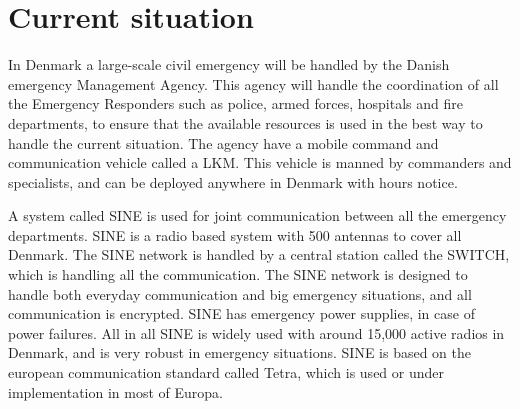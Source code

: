\section{Current situation}

In Denmark a large-scale civil emergency will be handled by the Danish emergency Management Agency. This agency will handle the coordination of all the Emergency Responders such as police, armed forces, hospitals and fire departments, to ensure that the available resources is used in the best way to handle the current situation. The agency have a mobile command and communication vehicle called a LKM. This vehicle is manned by commanders and specialists, and can be deployed anywhere in Denmark with hours notice.

A system called SINE is used for joint communication between all the emergency departments. SINE is a radio based system with 500 antennas to cover all Denmark. The SINE network is handled by a central station called the SWITCH, which is handling all the communication. The SINE network is designed to handle both everyday communication and big emergency situations, and all communication is encrypted. SINE has emergency power supplies, in case of power failures. All in all SINE is widely used with around 15,000 active radios in Denmark, and is very robust in emergency situations. SINE is based on the european communication standard called Tetra, which is used or under implementation in most of Europa.